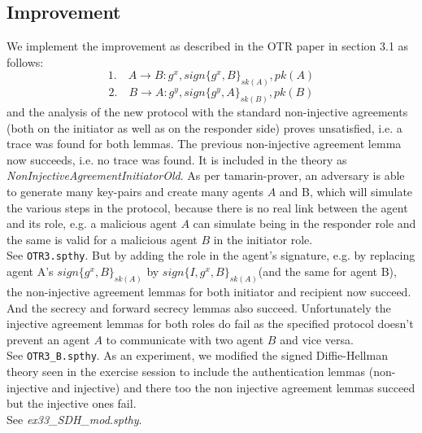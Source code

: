 \documentclass[a4paper,11pt]{scrartcl}
\begin{document}
\subsection{Improvement}
We implement the improvement as described in the OTR paper in section 3.1 as follows:
\[ \text{1.} \quad A \rightarrow B: g^x, sign\{g^x, B\}_{sk(A)}, pk(A) \]
\[ \text{2.} \quad B \rightarrow A: g^y, sign\{g^y, A\}_{sk(B)}, pk(B) \]
and the analysis of the new protocol with the standard non-injective agreements (both on the initiator as well as on the responder side) proves unsatisfied, i.e. a trace was found for both lemmas. The previous non-injective agreement lemma now succeeds, i.e. no trace was found. It is included in the theory as \emph{NonInjectiveAgreementInitiatorOld}.
\newline
As per tamarin-prover, an adversary is able to generate many key-pairs and create many agents $A$ and B, which will simulate the various steps in the protocol, because there is no real link between the agent and its role, e.g. a malicious agent $A$ can simulate being in the responder role and the same is valid for a malicious agent $B$ in the initiator role.\\
See \texttt{OTR3.spthy}.
\newpage
But by adding the role in the agent's signature, e.g. by replacing agent A's  $sign\{g^x, B\}_{sk(A)}$  by  $sign\{I, g^x, B\}_{sk(A)}$(and the same for agent B), the non-injective agreement lemmas for both initiator and recipient now succeed. And the secrecy and forward secrecy lemmas also succeed. Unfortunately the injective agreement lemmas for both roles do fail as the specified protocol doesn't prevent an agent $A$ to communicate with two agent $B$ and vice versa. \\
See \texttt{OTR3\_B.spthy}.
\newline
As an experiment, we modified the signed Diffie-Hellman theory seen in the exercise session to include the authentication lemmas (non-injective and injective) and there too the non injective agreement lemmas succeed but the injective ones fail. \\
See \emph{ex33\_SDH\_mod.spthy}.
\end{document}
